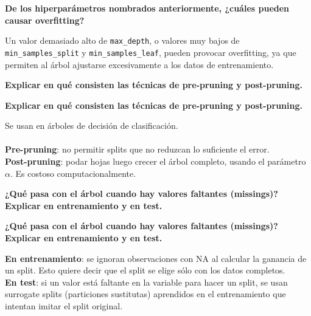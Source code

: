 \documentclass[10pt]{memoir}
\begin{document}
\clearpage
\begin{center}
	\textbf{\Large De los hiperparámetros nombrados anteriormente, ¿cuáles pueden causar overfitting?} \\
\end{center}
\noindent Un valor demasiado alto de \texttt{max\_depth}, o valores muy bajos de \texttt{min\_samples\_split} y \texttt{min\_samples\_leaf},
pueden provocar overfitting, ya que permiten al árbol ajustarse excesivamente a los datos de entrenamiento.

\clearpage
\begin{center}
	\textbf{\Large Explicar en qué consisten las técnicas de pre-pruning y post-pruning.} \\
\end{center}

\clearpage
\begin{center}
	\textbf{\Large Explicar en qué consisten las técnicas de pre-pruning y post-pruning.} \\
\end{center}
\noindent Se usan en árboles de decisión de clasificación. \\
\\
\noindent \textbf{Pre-pruning}: no permitir splits que no reduzcan lo suficiente el error. \\
\textbf{Post-pruning}: podar hojas luego crecer el árbol completo, usando el parámetro $\alpha$. Es costoso computacionalmente.

\clearpage
\begin{center}
	\textbf{\Large ¿Qué pasa con el árbol cuando hay valores faltantes (missings)? Explicar en entrenamiento y en test.} \\
\end{center}

\clearpage
\begin{center}
	\textbf{\Large ¿Qué pasa con el árbol cuando hay valores faltantes (missings)? Explicar en entrenamiento y en test.} \\
\end{center}
\noindent \textbf{En entrenamiento}: se ignoran observaciones con NA al calcular la ganancia de un split. Esto quiere decir que el split se elige sólo con los datos completos. \\

\noindent \textbf{En test}: si un valor está faltante en la variable para hacer un split, se usan surrogate splits (particiones sustitutas) aprendidos en el entrenamiento que intentan imitar el split original.
\end{document}
